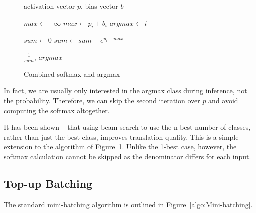 \documentclass[11pt,a4paper]{article}
\begin{document}
\begin{figure} [h]
\begin{algorithmic}
\REQUIRE activation vector $p$, bias vector $b$


\STATE $max \gets - \infty$ 
    \STATE $max \gets p_i + b_i$
    \STATE $argmax \gets i$
  \ENDIF
\ENDFOR 


\STATE $sum \gets 0$ 
    \STATE $sum \gets sum + e^{p_i - max}$
  \ENDIF
\ENDFOR 

\RETURN $\frac{1}{sum}$, $argmax$ 


\end{algorithmic}
\caption{Combined softmax and argmax}
\label{algo:Fused Kernel}
\end{figure}


In fact, we are usually only interested in the argmax class during inference, not the probability. Therefore, we can skip the second iteration over $p$ and avoid computing the softmax altogether. %

% 
% 
% 
% 

It has been shown ~\citep{koehn-knowles:2017:NMT} that using beam search to use the n-best number of classes, rather than just the best class, improves translation quality. This is a simple extension to the algorithm of Figure~\ref{algo:Fused Kernel}. Unlike the 1-best case, however, the softmax calculation cannot be skipped as the denominator differs for each input.


\subsection{Top-up Batching}

The standard mini-batching algorithm is outlined in Figure~\ref{algo:Mini-batching}.
\end{document}

